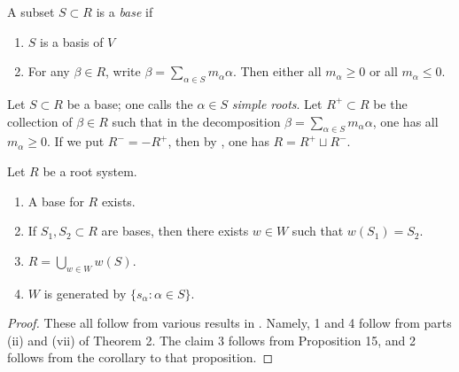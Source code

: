 \begin{definition}
A subset $S\subset R$ is a \emph{base} if 
\begin{enumerate}
  \item $S$ is a basis of $V$
  \item For any $\beta\in R$, write $\beta=\sum_{\alpha\in S} m_\alpha \alpha$. 
    Then either all $m_\alpha\geqslant 0$ or all $m_\alpha\leqslant 0$. 
\end{enumerate}
\end{definition}

Let $S\subset R$ be a base; one calls the $\alpha\in S$ \emph{simple roots}. 
Let $R^+\subset R$ be the collection of $\beta\in R$ such that in the 
decomposition $\beta=\sum_{\alpha\in S} m_\alpha \alpha$, one has all 
$m_\alpha\geqslant 0$. If we put $R^-=-R^+$, then by 
\cite[VI \S 1.6 th.3]{bourbaki-lie-alg-4-6}, one has 
$R=R^+\sqcup R^-$. 

\begin{theorem}
Let $R$ be a root system. 
\begin{enumerate}
\item A base for $R$ exists. 
\item If $S_1,S_2\subset R$ are bases, then there exists $w\in W$ such that 
$w(S_1)=S_2$. 
\item $R=\bigcup_{w\in W} w(S)$. 
\item $W$ is generated by $\{s_\alpha:\alpha\in S\}$. 
\end{enumerate}
\end{theorem}
\begin{proof}
These all follow from various results in 
\cite[VI \S 1.5]{bourbaki-lie-alg-4-6}. Namely, 1 and 4 follow from parts 
(ii) and (vii) of Theorem 2. The claim 3 follows from Proposition 15, and 2 
follows from the corollary to that proposition. 
\end{proof}

